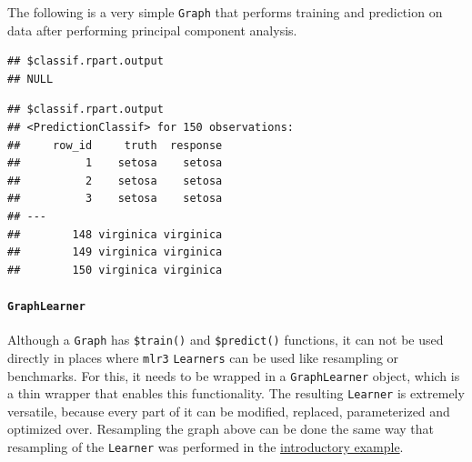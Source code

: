 \documentclass[]{article}
\newenvironment{Shaded}{\begin{snugshade}}{\end{snugshade}}
\newcommand{\KeywordTok}[1]{\textcolor[rgb]{0.13,0.29,0.53}{\textbf{#1}}}
\newcommand{\NormalTok}[1]{#1}
\newcommand{\OperatorTok}[1]{\textcolor[rgb]{0.81,0.36,0.00}{\textbf{#1}}}
\newcommand{\StringTok}[1]{\textcolor[rgb]{0.31,0.60,0.02}{#1}}
\let\oldparagraph\paragraph
\renewcommand{\paragraph}[1]{\oldparagraph{#1}\mbox{}}
\renewenvironment{Shaded} {\begin{snugshade}\small} {\end{snugshade}}
\begin{document}
The following is a very simple \texttt{Graph} that performs training and prediction on data after performing principal component analysis.

\begin{Shaded}
\end{Shaded}

\begin{Shaded}
\end{Shaded}

\begin{verbatim}
## $classif.rpart.output
## NULL
\end{verbatim}

\begin{Shaded}
\end{Shaded}

\begin{verbatim}
## $classif.rpart.output
## <PredictionClassif> for 150 observations:
##     row_id     truth  response
##          1    setosa    setosa
##          2    setosa    setosa
##          3    setosa    setosa
## ---                           
##        148 virginica virginica
##        149 virginica virginica
##        150 virginica virginica
\end{verbatim}

\hypertarget{graphlearner}{%
\paragraph{\texorpdfstring{\texttt{GraphLearner}}{GraphLearner}}\label{graphlearner}}

Although a \texttt{Graph} has \texttt{\$train()} and \texttt{\$predict()} functions, it can not be used directly in places where \texttt{mlr3} \texttt{Learners} can be used like resampling or benchmarks.
For this, it needs to be wrapped in a \texttt{GraphLearner} object, which is a thin wrapper that enables this functionality.
The resulting \texttt{Learner} is extremely versatile, because every part of it can be modified, replaced, parameterized and optimized over.
Resampling the graph above can be done the same way that resampling of the \texttt{Learner} was performed in the \protect\hyperlink{whats-the-point}{introductory example}.
\end{document}

